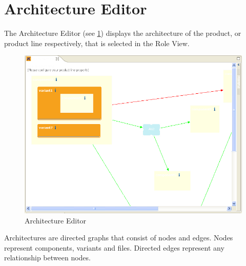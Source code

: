 \section{Architecture Editor}

The Architecture Editor (see \ref{architecture}) displays the architecture of the product,
or product line respectively, that is selected in the Role View. \par

\begin{figure}[h!]
\begin{center}
\includegraphics[width=15cm]{architecture.png}
   \caption{Architecture Editor}
\label{architecture}
\end{center}
\end{figure}\par

Architectures are directed graphs that consist of nodes and edges. 
Nodes represent components, variants and files. Directed edges represent
any relationship between nodes.\par

